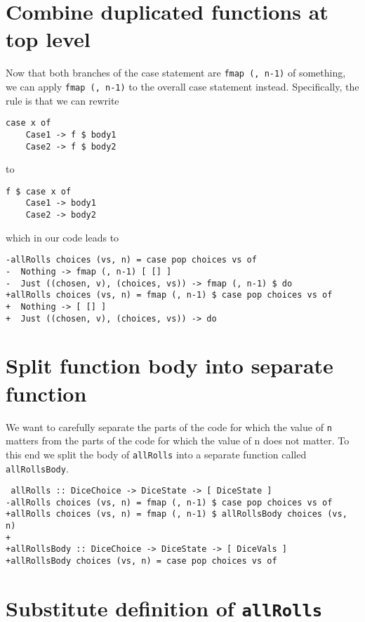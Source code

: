 \section{Combine duplicated functions at top level}


Now that both branches of the case statement are \texttt{fmap (, n-1)} of something, we can apply \texttt{fmap (, n-1)} to the overall case statement instead. Specifically, the rule is that we can rewrite

\begin{verbatim}
case x of
    Case1 -> f $ body1
    Case2 -> f $ body2
\end{verbatim}
to

\begin{verbatim}
f $ case x of
    Case1 -> body1
    Case2 -> body2
\end{verbatim}
which in our code leads to

\begin{verbatim}
-allRolls choices (vs, n) = case pop choices vs of
-  Nothing -> fmap (, n-1) [ [] ]
-  Just ((chosen, v), (choices, vs)) -> fmap (, n-1) $ do
+allRolls choices (vs, n) = fmap (, n-1) $ case pop choices vs of
+  Nothing -> [ [] ]
+  Just ((chosen, v), (choices, vs)) -> do
\end{verbatim}


\section{Split function body into separate function}


We want to carefully separate the parts of the code for which the value of \texttt{n} matters from the parts of the code for which the value of n does not matter. To this end we split the body of \texttt{allRolls} into a separate function called \texttt{allRollsBody}.

\begin{verbatim}
 allRolls :: DiceChoice -> DiceState -> [ DiceState ]
-allRolls choices (vs, n) = fmap (, n-1) $ case pop choices vs of
+allRolls choices (vs, n) = fmap (, n-1) $ allRollsBody choices (vs, n)
+
+allRollsBody :: DiceChoice -> DiceState -> [ DiceVals ]
+allRollsBody choices (vs, n) = case pop choices vs of
\end{verbatim}


\section{Substitute definition of \texttt{allRolls}}

